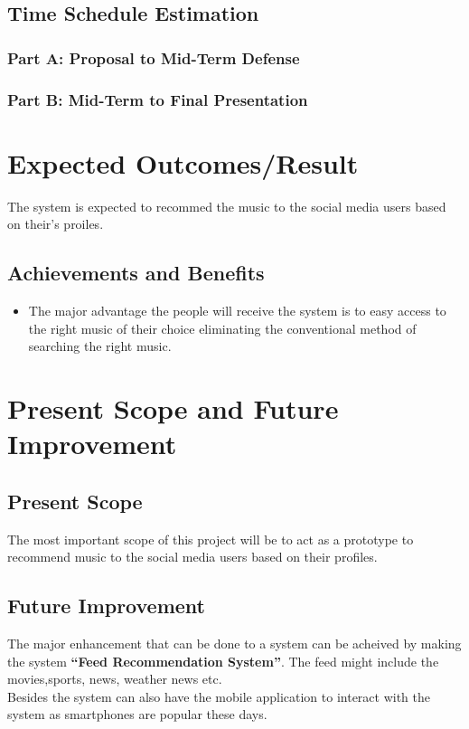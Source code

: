\documentclass{article}
\begin{document}
\subsection{Time Schedule Estimation}
\cleardoublepage

\subsubsection{Part A: Proposal to Mid-Term Defense}
\cleardoublepage
\subsubsection{Part B: Mid-Term to Final Presentation}
\cleardoublepage


\section{Expected Outcomes/Result}
The system is expected to recommed the music to the social media users based on their's proiles.
\subsection{Achievements and Benefits}
\begin{itemize}
	\item The major advantage the people will receive the system is to easy access to the right music of their choice eliminating the conventional method of searching the right music. 
\end{itemize}
\cleardoublepage

\section{Present Scope and Future Improvement}
\subsection{Present Scope}
The most important scope of this project will be to act as a prototype to recommend music to the social media users based on their profiles.
\subsection{Future Improvement}
The major enhancement that can be done to a system can be acheived by making the system \textbf{``Feed Recommendation System''}. The feed might include the movies,sports, news, weather news etc.\\
Besides the system can also have the mobile application to interact with the system as smartphones are popular these days.
\cleardoublepage
\end{document}
